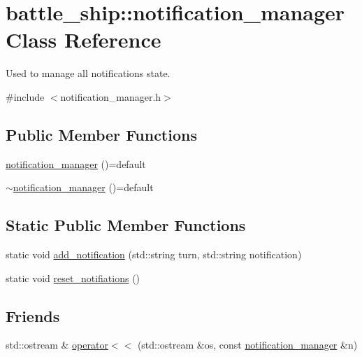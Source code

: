 \hypertarget{classbattle__ship_1_1notification__manager}{}\section{battle\+\_\+ship\+:\+:notification\+\_\+manager Class Reference}
\label{classbattle__ship_1_1notification__manager}


Used to manage all notifications state.  




{\ttfamily \#include $<$notification\+\_\+manager.\+h$>$}

\subsection*{Public Member Functions}
\begin{DoxyCompactItemize}
\item 
\hyperlink{classbattle__ship_1_1notification__manager_a87ccb2f8410219be087e216ae0dd0512}{notification\+\_\+manager} ()=default
\item 
\hyperlink{classbattle__ship_1_1notification__manager_ac6581333d9b6fb0fd4d66432bab5e1f4}{$\sim$notification\+\_\+manager} ()=default
\end{DoxyCompactItemize}
\subsection*{Static Public Member Functions}
\begin{DoxyCompactItemize}
\item 
static void \hyperlink{classbattle__ship_1_1notification__manager_abb17bb5ac063b9ba4e7d0aa8a15e3628}{add\+\_\+notification} (std\+::string turn, std\+::string notification)
\item 
static void \hyperlink{classbattle__ship_1_1notification__manager_ad5b73a016f63f919695dd8387c895d50}{reset\+\_\+notifiations} ()
\end{DoxyCompactItemize}
\subsection*{Friends}
\begin{DoxyCompactItemize}
\item 
std\+::ostream \& \hyperlink{classbattle__ship_1_1notification__manager_ae88cf18d6c7447486803aa949db9b667}{operator$<$$<$} (std\+::ostream \&os, const \hyperlink{classbattle__ship_1_1notification__manager}{notification\+\_\+manager} \&n)
\end{DoxyCompactItemize}


